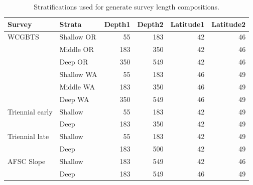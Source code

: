 \documentclass[
]{scrartcl}
\begin{document}
\begin{longtable}{llrrrr}

\caption{\label{tbl-survey_strata}Stratifications used for generate
survey length compositions.}

\tabularnewline

\toprule
Survey & Strata & Depth1 & Depth2 & Latitude1 & Latitude2 \\ 
\midrule\addlinespace[2.5pt]
WCGBTS & Shallow OR & 55 & 183 & 42 & 46 \\ 
 & Middle OR & 183 & 350 & 42 & 46 \\ 
 & Deep OR & 350 & 549 & 42 & 46 \\ 
 & Shallow WA & 55 & 183 & 46 & 49 \\ 
 & Middle WA & 183 & 350 & 46 & 49 \\ 
 & Deep WA & 350 & 549 & 46 & 49 \\ 
Triennial early & Shallow & 55 & 183 & 42 & 49 \\ 
 & Deep & 183 & 350 & 42 & 49 \\ 
Triennial late & Shallow & 55 & 183 & 42 & 49 \\ 
 & Deep & 183 & 500 & 42 & 49 \\ 
AFSC Slope & Shallow & 183 & 549 & 42 & 46 \\ 
 & Deep & 183 & 549 & 46 & 49 \\ 
\bottomrule

\end{longtable}

\endgroup

\newpage{}

\begingroup
\fontsize{9.0pt}{10.8pt}\selectfont
\end{document}

